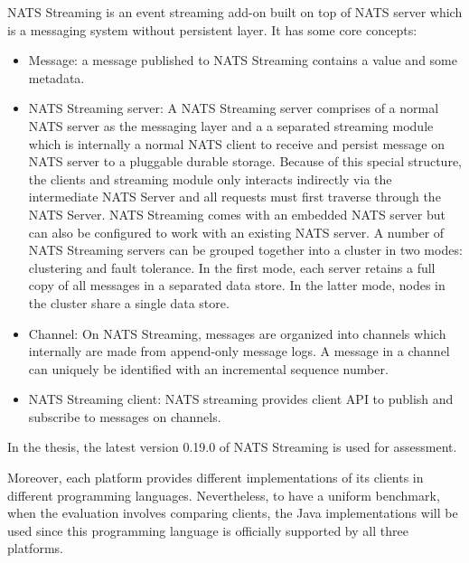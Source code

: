 NATS Streaming is an event streaming add-on built on top of NATS server which is a messaging system without persistent layer. It has some core concepts:
\begin{itemize}
	\item Message: a message published to NATS Streaming contains a value and some metadata.	
	\item NATS Streaming server: A NATS Streaming server comprises of a normal NATS server as the messaging layer and a a separated streaming module which is internally a normal NATS client to receive and persist message on NATS server to a pluggable durable storage.  Because of this special structure, the clients and streaming module only interacts indirectly via the intermediate NATS Server and all requests must first traverse through the NATS Server. NATS Streaming comes with an embedded NATS server but can also be configured to work with an existing NATS server. A number of NATS Streaming servers can be grouped together into a cluster in two modes: clustering and fault tolerance. In the first mode, each server retains a full copy of all messages in a separated data store. In the latter mode, nodes in the cluster share a single data store.
	\item Channel: On NATS Streaming, messages are organized into channels which internally are made from append-only message logs. A message in a channel can uniquely be identified with an incremental sequence number.
	\item NATS Streaming client: NATS streaming provides client API to publish and subscribe to messages on channels.  
\end{itemize}
In the thesis, the latest version 0.19.0 of NATS Streaming is used for assessment.

Moreover, each platform provides different implementations of its clients in different programming languages. Nevertheless, to have a uniform benchmark, when the evaluation involves comparing clients, the Java implementations will be used since this programming language is officially supported by all three platforms.












